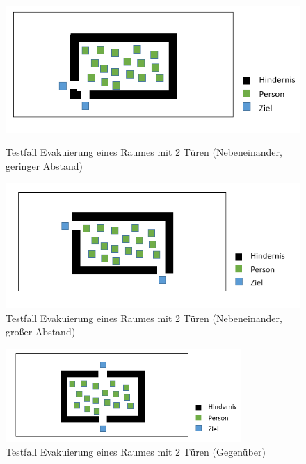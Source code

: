 \begin{figure}[!htb]
	\centering
	\begin{minipage}{.5\textwidth}
		\centering
		\includegraphics[width=\textwidth]{abbildungen/Test_Evakuierung2_Nebeneinander.png}
		\caption{Testfall Evakuierung eines Raumes mit 2 Türen (Nebeneinander, geringer Abstand)}
		\label{fig:AnforderungenTestEvak2TürNebeneinanderMin}
	\end{minipage}%
	\begin{minipage}{0.5\textwidth}
		\centering
		\includegraphics[width=\textwidth]{abbildungen/Test_Evakuierung2_NebeneinanderMax.png}
		\caption{Testfall Evakuierung eines Raumes mit 2 Türen (Nebeneinander, großer Abstand)}
		\label{fig:AnforderungenTestEvak2TürNebeneinanderMax}
	\end{minipage}
\end{figure}

\begin{figure}[htpb]
	\centering
	\includegraphics[width=0.8\textwidth]{abbildungen/Test_Evakuierung2_Gegueb.png}
	\caption{Testfall Evakuierung eines Raumes mit 2 Türen (Gegenüber)}
	\label{fig:Test_Evakuierung2_Gegueb}
\end{figure}

